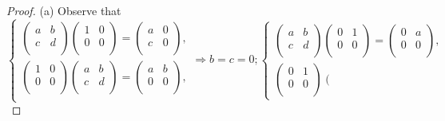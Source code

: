 \begin{proof}
(a) Observe that 
$$
\left\{ \begin{array}{c}
	\left( \begin{matrix}
	a&		b\\
	c&		d\\
\end{matrix} \right) \left( \begin{matrix}
	1&		0\\
	0&		0\\
\end{matrix} \right) =\left( \begin{matrix}
	a&		0\\
	c&		0\\
\end{matrix} \right) ,\\
	\left( \begin{matrix}
	1&		0\\
	0&		0\\
\end{matrix} \right) \left( \begin{matrix}
	a&		b\\
	c&		d\\
\end{matrix} \right) =\left( \begin{matrix}
	a&		b\\
	0&		0\\
\end{matrix} \right) ,\\
\end{array} \right. \Rightarrow b=c=0;\left\{ \begin{array}{c}
	\left( \begin{matrix}
	a&		b\\
	c&		d\\
\end{matrix} \right) \left( \begin{matrix}
	0&		1\\
	0&		0\\
\end{matrix} \right) =\left( \begin{matrix}
	0&		a\\
	0&		0\\
\end{matrix} \right) ,\\
	\left( \begin{matrix}
	0&		1\\
	0&		0\\
\end{matrix} \right) \left( \begin{matrix}

\end{matrix}
\end{array}$$
\end{proof}
